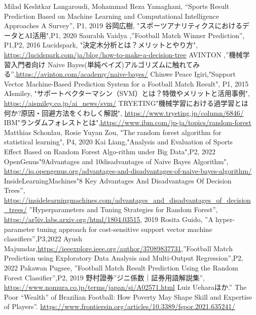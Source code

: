 \documentclass[platex]{suribt}
\begin{document}
\begin{thebibliography}{2}%
\bibitem{}
Milad Keshtkar Langaroudi, Mohammad Reza Yamaghani, “Sports Result Prediction Based on Machine Learning and Computational Intelligence Approaches A Survey”, P1, 2019
\bibitem{}
谷岡広樹, "スポーツアナリティクスにおけるデータとAI活用",P1, 2020
\bibitem{}
Saurabh Vaidya ,”Football Match Winner Prediction”, P1,P2, 2016
\bibitem{}
Lucidspark, "決定木分析とは？メリットとやり方", \url{https://lucidspark.com/ja/blog/how-to-make-a-decision-tree}
\bibitem{}
AVINTON ,”機械学習入門者向け Naive Bayes(単純ベイズ)アルゴリズムに触れてみる”,\url{https://avinton.com/academy/naive-bayes/}
\bibitem{}
Chinwe Peace Igiri,"Support Vector Machine-Based Prediction System for a Football Match Result", P1, 2015
\bibitem{}
AIsmiley, "サポートベクターマシン（SVM）とは？特徴やメリットと活用事例", \url{https://aismiley.co.jp/ai_news/svm/}
\bibitem{}
TRYETING"機械学習における過学習とは何か?原因・回避方法をくわしく解説", \url{https://www.tryeting.jp/column/6846/}
\bibitem{}
IBM"ランダムフォレストとは",\url{https://www.ibm.com/jp-ja/topics/random-forest}
\bibitem{}
Matthias Schonlau, Rosie Yuyan Zou, "The random forest algorithm for statistical learning", P4, 2020
\bibitem{}
Kai Liang,"Analysis and Evaluation of Sports Effect Based on Random Forest Algo-rithm under Big Data",P2, 2022
\bibitem{}
OpenGenus"9Advantages and 10disadvantages of Naive Bayes Algorithm", \url{https://iq.opengenus.org/advantages-and-disadvantages-of-naive-bayes-algorithm/}
\bibitem{}
InsideLearningMachines"8 Key Advantages And Disadvantages Of Decision Trees”, \url{https://insidelearningmachines.com/advantages_and_disadvantages_of_decision_trees/}
\bibitem{}
”Hyperparameters and Tuning Strategies for Random Forest”, \url{https://ar5iv.labs.arxiv.org/html/1804.03515}, 2019
\bibitem{}
Rosita Guido, ”A hyper-parameter tuning approach for cost-sensitive support vector machine classifiers”,P3,2022
\bibitem{}
Ayush Majumdar,\url{https://ieeexplore.ieee.org/author/37089837731},”Football Match Prediction using Exploratory Data Analysis and Multi-Output Regression”,P2, 2022
\bibitem{}
Pakawan Pugsee, ”Football Match Result Prediction Using the Random Forest Classifier”,P2, 2019
\bibitem{}
野村證券”ジニ係数｜証券用語解説集”, \url{https://www.nomura.co.jp/terms/japan/si/A02571.html}
\bibitem{}
Luiz Ueharaほか.” The Poor “Wealth” of Brazilian Football: How Poverty May Shape Skill and Expertise of Players”. \url{https://www.frontiersin.org/articles/10.3389/fspor.2021.635241/}


\end{thebibliography}
\appendix%
\chapter{}
\end{document}
